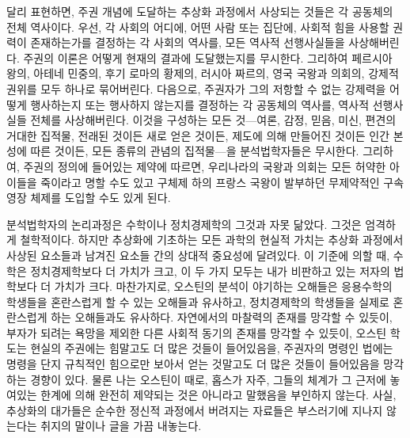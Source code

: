 달리 표현하면,
주권 개념에 도달하는 추상화 과정에서 사상되는 것들은
각 공동체의 전체 역사이다.
우선,
각 사회의 어디에, 어떤 사람 또는 집단에,
사회적 힘을 사용할 권력이 존재하는가를 결정하는
각 사회의 역사를, 모든 역사적 선행사실들을 사상해버린다.
주권의 이론은 어떻게 현재의 결과에 도달했는지를 무시한다.
그리하여 페르시아 왕의, 아테네 민중의, 후기 로마의 황제의,
러시아 짜르의, 영국 국왕과 의회의, 강제적 권위를 모두 하나로 묶어버린다.
다음으로,
주권자가 그의 저항할 수 없는 강제력을 어떻게 행사하는지 또는 행사하지 않는지를
결정하는
각 공동체의 역사를, 역사적 선행사실들 전체를 사상해버린다.
이것을 구성하는 모든 것---여론, 감정, 믿음, 미신, 편견의 거대한 집적물,
전래된 것이든 새로 얻은 것이든, 제도에 의해 만들어진 것이든
인간 본성에 따른 것이든,
모든 종류의 관념의 집적물---을 분석법학자들은 무시한다.
그리하여,
주권의 정의에 들어있는 제약에 따르면,
우리나라의 국왕과 의회는 모든 허약한 아이들을 죽이라고 명할 수도 있고
구체제 하의 프랑스 국왕이 발부하던 무제약적인 구속영장
체제를 도입할 수도 있게 된다.

분석법학자의 논리과정은 수학이나 정치경제학의 그것과 자못 닮았다.
그것은 엄격하게 철학적이다.
하지만 추상화에 기초하는 모든 과학의 현실적 가치는
추상화 과정에서 사상된 요소들과 남겨진 요소들 간의 상대적 중요성에 달려있다.
이 기준에 의할 때, 수학은 정치경제학보다 더 가치가 크고,
이 두 가지 모두는 내가 비판하고 있는 저자의 법학보다 더 가치가 크다.
마찬가지로,
오스틴의 분석이 야기하는 오해들은
응용수학의 학생들을 혼란스럽게 할 수 있는
오해들과 유사하고,
정치경제학의 학생들을 실제로 혼란스럽게 하는 오해들과도 유사하다.
자연에서의 마찰력의 존재를 망각할 수 있듯이,
부자가 되려는 욕망을 제외한 다른 사회적 동기의 존재를 망각할 수 있듯이,
오스틴 학도는 현실의 주권에는 힘말고도 더 많은 것들이 들어있음을,
주권자의 명령인 법에는 명령을 단지 규칙적인 힘으로만 보아서 얻는 것말고도
더 많은 것들이 들어있음을 망각하는 경향이 있다.
물론 나는 오스틴이 때로, 홉스가 자주, 그들의 체계가
그 근저에 놓여있는 한계에 의해 완전히 제약되는 것은 아니라고 말했음을
부인하지 않는다.
사실, 추상화의 대가들은
순수한 정신적 과정에서 버려지는 자료들은 부스러기에 지나지 않는다는
취지의 말이나 글을
가끔 내놓는다.


